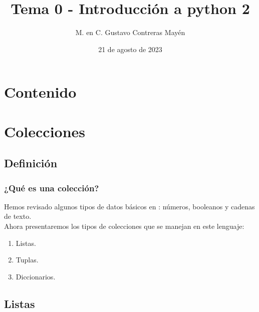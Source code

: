 \documentclass[12pt]{beamer}
\title{Tema 0 - Introducción a python 2}
\author{M. en C. Gustavo Contreras Mayén}
\date{21 de agosto de 2023}
\begin{document}
\maketitle

\section*{Contenido}

\section{Colecciones}
\subsection{Definición}

\begin{frame}
\frametitle{¿Qué es una colección?}
Hemos revisado algunos tipos de datos básicos en \python: números, booleanos y cadenas de texto.
\\
\bigskip
\pause
Ahora presentaremos los tipos de colecciones que se manejan en este lenguaje:
\pause
{}
\begin{enumerate}[<+->]
\item Listas.
\item Tuplas.
\item Diccionarios.
\end{enumerate}
\end{frame}

\subsection{Listas}
\end{document}
